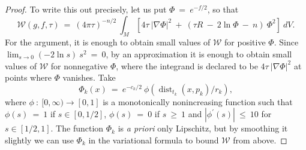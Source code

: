 \documentclass[12pt]{amsart}
\newcommand{\dist}{\operatorname{dist}}
\newcommand{\ra}{\rightarrow}
\numberwithin{equation}{section}
\theoremstyle{plain}
\theoremstyle{definition}
\theoremstyle{remark}
\begin{document}
\begin{proof}
To write this out precisely, let us put $\Phi \: = \: e^{- f/2}$, so
that 
\begin{equation}
{\mathcal W}(g, f, \tau) \: = \: (4 \pi \tau)^{-n/2} \:
\int_M \left[ 4 \tau \: |\nabla \Phi|^2 \: + \:
( \tau R \: - \: 2 \ln \Phi
\: - \: n ) \: \Phi^2 \right] \: dV.
\end{equation}
For the argument, it is enough to obtain small values of ${\mathcal W}$ for 
positive $\Phi$.   Since $\lim_{s\ra 0}(-2\ln s)\:s^2\:=\:0$, 
by an approximation it is enough to obtain small values of ${\mathcal W}$ for 
nonnegative $\Phi$, where the integrand is declared to be 
$4 \tau \: |\nabla \Phi|^2$ at points where $\Phi$ vanishes. Take 
\begin{equation}
\Phi_k(x) \: = \: e^{- c_k/2} \: \phi(\dist_{t_k}(x, p_k)/r_k),
\end{equation}
where $\phi \: : \: [0, \infty) \rightarrow [0, 1]$ is 
a monotonically nonincreasing function such that
$\phi(s) \: = \: 1$ if $s \in [0, 1/2]$, $\phi(s) \: = \: 0$ if $s \: \ge \: 1$
and $|\phi^\prime(s)| \: \le \: 10$ for $s \in [1/2, 1]$.
The function $\Phi_k$ is {\it a priori} only Lipschitz, but by smoothing
it slightly we can use $\Phi_k$ in the variational formula 
to bound ${\mathcal W}$ from above.


\end{proof}
\end{document}
